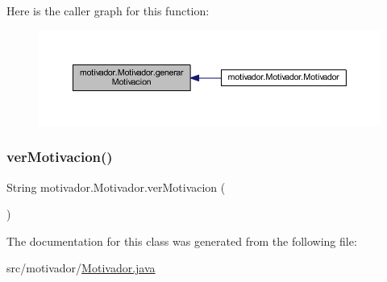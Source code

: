 Here is the caller graph for this function\+:
\nopagebreak
\begin{figure}[H]
\begin{center}
\leavevmode
\includegraphics[width=350pt]{classmotivador_1_1_motivador_a60414f3933faaf5fd97ed5c0a2b6d160_icgraph}
\end{center}
\end{figure}
\mbox{\label{classmotivador_1_1_motivador_adddea17f72d1be66da740279b742ae3d}} 
\subsubsection{\texorpdfstring{ver\+Motivacion()}{verMotivacion()}}
{\footnotesize\ttfamily String motivador.\+Motivador.\+ver\+Motivacion (\begin{DoxyParamCaption}{ }\end{DoxyParamCaption})}



The documentation for this class was generated from the following file\+:\begin{DoxyCompactItemize}
\item 
src/motivador/\mbox{\hyperlink{_motivador_8java}{Motivador.\+java}}\end{DoxyCompactItemize}
